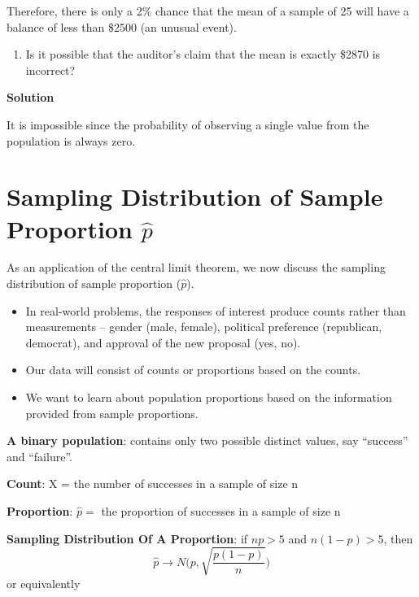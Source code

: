 \documentclass[
]{book}
\providecommand{\tightlist}{%
  \setlength{\itemsep}{0pt}\setlength{\parskip}{0pt}}
\begin{document}
Therefore, there is only a 2\% chance that the mean of a sample of 25 will have a balance of less than \$2500 (an unusual event).

\begin{enumerate}
\def\labelenumi{\arabic{enumi}.}
\setcounter{enumi}{2}
\tightlist
\item
  Is it possible that the auditor's claim that the mean is exactly \$2870 is incorrect?
\end{enumerate}

\textbf{Solution}

It is impossible since the probability of observing a single value from the population is always zero.

\hfill\break

\hypertarget{sampling-distribution-of-sample-proportion-hatp}{%
\section{\texorpdfstring{Sampling Distribution of Sample Proportion \(\hat{p}\)}{Sampling Distribution of Sample Proportion \textbackslash hat\{p\}}}\label{sampling-distribution-of-sample-proportion-hatp}}

As an application of the central limit theorem, we now discuss the sampling distribution of sample proportion (\(\hat{p}\)).

\begin{itemize}
\item
  In real-world problems, the responses of interest produce counts rather than measurements -- gender (male, female), political preference (republican, democrat), and approval of the new proposal (yes, no).
\item
  Our data will consist of counts or proportions based on the counts.
\item
  We want to learn about population proportions based on the information provided from sample proportions.
\end{itemize}

\textbf{A binary population}: contains only two possible distinct values, say ``success'' and ``failure''.

\textbf{Count}: X = the number of successes in a sample of size n

\textbf{Proportion}: \(\hat{p} =\) the proportion of successes in a sample of size n

\textbf{Sampling Distribution Of A Proportion}: if \(np > 5\) and \(n(1-p) > 5\), then
\[
\hat{p} \to N\Big( p, \sqrt{\frac{p(1-p)}{n}}\Big)
\]
or equivalently
\end{document}
